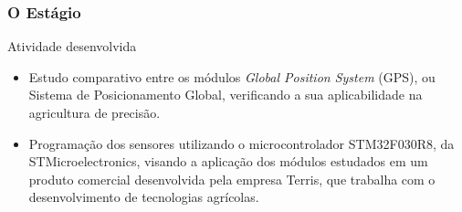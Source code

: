 \begin{frame}
\frametitle{O Estágio}

\begin{block}{Atividade desenvolvida}
\begin{itemize}
\item Estudo comparativo entre os módulos \textit{Global Position System} (GPS), ou Sistema de Posicionamento Global, verificando a sua aplicabilidade na agricultura de precisão.
\pause 
\item Programação dos sensores utilizando o microcontrolador STM32F030R8, da STMicroelectronics\textregistered, visando a aplicação dos módulos estudados em um produto comercial desenvolvida pela empresa Terris\textregistered, que trabalha com o desenvolvimento de tecnologias agrícolas.
\end{itemize}
\end{block}

\end{frame}


